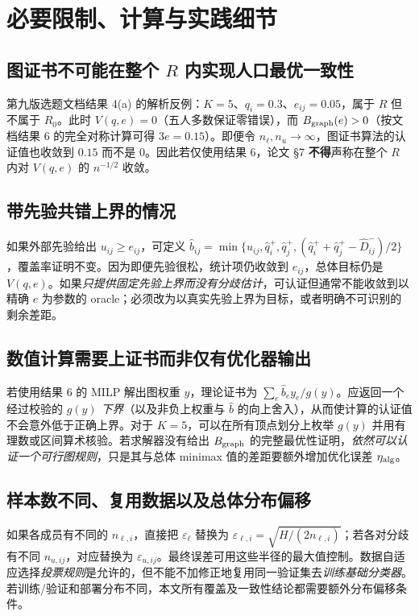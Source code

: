 \documentclass[11pt,a4paper]{ctexart}
\theoremstyle{definition}
\newcommand{\epsl}{\varepsilon_{\ell}}
\begin{document}
\section{必要限制、计算与实践细节}
\subsection{图证书不可能在整个 $R$ 内实现人口最优一致性}
第九版选题文档结果 4(a) 的解析反例：$K=5$、$q_i=0.3$、$e_{ij}=0.05$，属于 $R$ 但不属于 $R_0$。此时 $V(q,e)=0$（五人多数保证零错误），而 $B_{\rm graph}(e)>0$（按文档结果 6 的完全对称计算可得 $3e=0.15$）。即便令 $n_\ell,n_u\to\infty$，图证书算法的认证值也收敛到 $0.15$ 而不是 $0$。因此若仅使用结果 6，论文 \S7 \textbf{不得}声称在整个 $R$ 内对 $V(q,e)$ 的 $n^{-1/2}$ 收敛。

\subsection{带先验共错上界的情况}
如果外部先验给出 $u_{ij}\ge e_{ij}$，可定义
$\hat b_{ij}=\min\{u_{ij},\hat q_i^+,\hat q_j^+,(\hat q_i^++\hat q_j^+-\hat D_{ij}^-)/2\}$，覆盖率证明不变。因为即便先验很松，统计项仍收敛到 $e_{ij}$，总体目标仍是 $V(q,e)$。如果\emph{只提供固定先验上界而没有分歧估计}，可认证但通常不能收敛到以精确 $e$ 为参数的 oracle；必须改为以真实先验上界为目标，或者明确不可识别的剩余差距。

\subsection{数值计算需要上证书而非仅有优化器输出}
若使用结果 6 的 MILP 解出图权重 $y$，理论证书为
$\sum_e\hat b_e y_e/g(y)$。应返回一个经过校验的 $g(y)$ \emph{下界}（以及非负上权重与 $\hat b$ 的向上舍入），从而使计算的认证值不会意外低于正确上界。对于 $K=5$，可以在所有顶点划分上枚举 $g(y)$ 并用有理数或区间算术核验。若求解器没有给出 $B_{\rm graph}$ 的完整最优性证明，\emph{依然可以认证一个可行图规则}，只是其与总体 minimax 值的差距要额外增加优化误差 $\eta_{\rm alg}$。

\subsection{样本数不同、复用数据以及总体分布偏移}
如果各成员有不同的 $n_{\ell,i}$，直接把 $\epsl$ 替换为 $\varepsilon_{\ell,i}=\sqrt{H/(2n_{\ell,i})}$；若各对分歧有不同 $n_{u,ij}$，对应替换为 $\varepsilon_{u,ij}$。最终误差可用这些半径的最大值控制。数据自适应选择\emph{投票规则}是允许的，但不能不加修正地复用同一验证集去\emph{训练基础分类器}。若训练/验证和部署分布不同，本文所有覆盖及一致性结论都需要额外分布偏移条件。
\end{document}
